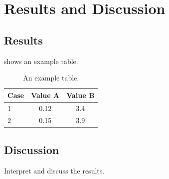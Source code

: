 \chapter{Results and Discussion}
\label{ch:results}

\section{Results}
 shows an example table.

\begin{table}[htbp]
  \centering
  \caption{An example table.}
  \label{tab:example}
  \begin{tabular}{lcc}
    \toprule
    Case & Value A & Value B \\
    \midrule
    1 & 0.12 & 3.4 \\
    2 & 0.15 & 3.9 \\
    \bottomrule
  \end{tabular}
\end{table}

\section{Discussion}
Interpret and discuss the results.
